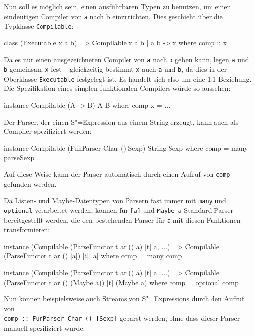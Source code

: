 \documentclass[11pt, a4paper, bibgerm]{scrbook}
\newenvironment{DIFnomarkup}{}{}
\newcommand\icode[1]{\lstinline?#1?}
\newcommand{\sexp}{S"=Expression}
\newcommand{\sexps}{S"=Expressions}
\begin{document}
Nun soll es möglich sein, einen ausführbaren Typen zu benutzen, um einen
eindeutigen Compiler von \icode{a} nach {b} einzurichten. Dies geschieht
über die Typklasse \icode{Compilable}:
\begin{DIFnomarkup}\begin{code}
class (Executable x a b) => Compilable x a b | a b -> x where
  comp :: x
\end{code}\end{DIFnomarkup}
Da es nur einen ausgezeichneten Compiler von \icode{a} nach \icode{b}
geben kann, legen \icode{a} und \icode{b} gemeinsam \icode{x} fest --
gleichzeitig bestimmt \icode{x} auch \icode{a} und \icode{b}, da dies in
der Oberklasse \icode{Executable} festgelegt ist. Es handelt sich also
um eine 1:1-Beziehung. Die Spezifikation eines simplen funktionalen
Compilers würde so aussehen:
\begin{DIFnomarkup}\begin{code}
instance Compilable (A -> B) A B where
  comp x = ...
\end{code}\end{DIFnomarkup}
Der Parser, der einen \sexp{} aus einem String erzeugt, kann auch als
Compiler spezifiziert werden:
\begin{DIFnomarkup}\begin{code}
instance Compilable (FunParser Char () Sexp) String Sexp where
  comp = many parseSexp
\end{code}\end{DIFnomarkup}
Auf diese Weise kann der Parser automatisch durch einen Aufruf von
\icode{comp} gefunden werden.

Da Listen- und Maybe-Datentypen von Parsern fast immer mit \icode{many}
und \icode{optional} verarbeitet werden, können für \icode{[a]} und
\icode{Maybe a} Standard-Parser bereitgestellt werden, die den
bestehenden Parser für \icode{a} mit diesen Funktionen transformieren:
\begin{DIFnomarkup}\begin{code}
instance (Compilable (ParseFunctor t ar () a) [t] a, ...) =>
  Compilable (ParseFunctor t ar () [a]) [t] [a] where
    comp = many comp

instance (Compilable (ParseFunctor t ar () a) [t] a. ...) =>
  Compilable (ParseFunctor t ar () (Maybe a)) [t] (Maybe a) where
    comp = optional comp
\end{code}\end{DIFnomarkup}
Nun können beispielsweise auch Streams von \sexps{} durch den Aufruf von
\\ \icode{comp :: FunParser Char () [Sexp]} geparst werden, ohne dass dieser
  Parser manuell spezifiziert wurde.
\end{document}
